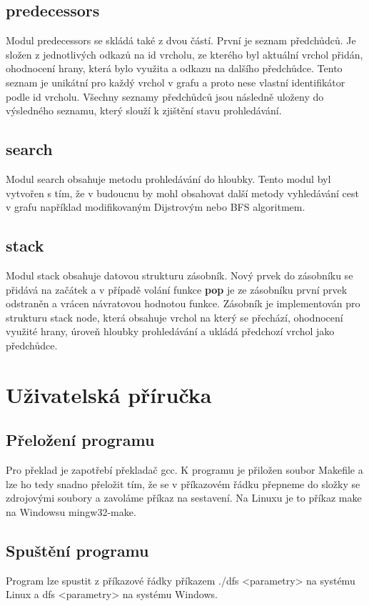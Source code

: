 \section{predecessors}
Modul predecessors se skládá také z dvou částí. První je seznam předchůdců. Je složen z jednotlivých odkazů na id vrcholu, ze kterého byl aktuální vrchol přidán, ohodnocení hrany, která bylo využita a odkazu na dalšího předchůdce. Tento seznam je unikátní pro každý vrchol v grafu a proto nese vlastní identifikátor podle id vrcholu. Všechny seznamy předchůdců jsou následně uloženy do výsledného seznamu, který slouží k zjištění stavu prohledávání.

\section{search}
Modul search obsahuje metodu prohledávání do hloubky. Tento modul byl vytvořen s tím, že v budoucnu by mohl obsahovat další metody vyhledávání cest v grafu například modifikovaným Dijstrovým nebo BFS algoritmem.

\section{stack}
Modul stack obsahuje datovou strukturu zásobník. Nový prvek do zásobníku se přidává na začátek a v případě volání funkce \textbf{pop} je ze zásobníku první prvek odstraněn a vrácen návratovou hodnotou funkce. Zásobník je implementován pro strukturu stack node, která obsahuje vrchol na který se přechází, ohodnocení využité hrany, úroveň hloubky prohledávání a ukládá předchozí vrchol jako předchůdce.

\chapter{Uživatelská příručka}
\section{Přeložení programu}
Pro překlad je zapotřebí překladač gcc. K programu je přiložen soubor Makefile a lze ho tedy snadno přeložit tím, že se v příkazovém řádku přepneme do složky se zdrojovými soubory a zavoláme příkaz na sestavení. Na Linuxu je to příkaz make na Windowsu mingw32-make.

\section{Spuštění programu}
Program lze spustit z příkazové řádky příkazem ./dfs <parametry> na systému Linux a dfs <parametry> na systému Windows.\\

